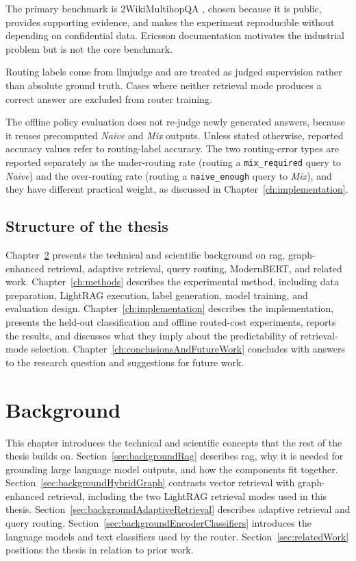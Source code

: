\documentclass[english, bibtex]{kththesis}               %
\numberwithin{listing}{chapter}
\begin{document}
The primary benchmark is 2WikiMultihopQA \cite{ho2020twowiki}, chosen because it is public, provides supporting evidence, and makes the experiment reproducible without depending on confidential data. Ericsson documentation motivates the industrial problem but is not the core benchmark.

Routing labels come from \gls{llmjudge} and are treated as judged supervision rather than absolute ground truth. Cases where neither retrieval mode produces a correct answer are excluded from router training.

The offline policy evaluation does not re-judge newly generated answers, because it reuses precomputed \emph{Naive} and \emph{Mix} outputs. Unless stated otherwise, reported accuracy values refer to routing-label accuracy. The two routing-error types are reported separately as the under-routing rate (routing a \texttt{mix\_required} query to \emph{Naive}) and the over-routing rate (routing a \texttt{naive\_enough} query to \emph{Mix}), and they have different practical weight, as discussed in Chapter~\ref{ch:implementation}.

\section{Structure of the thesis}
\label{sec:structure}

Chapter~\ref{ch:background} presents the technical and scientific background on \gls{rag}, graph-enhanced retrieval, adaptive retrieval, query routing, ModernBERT, and related work. Chapter~\ref{ch:methods} describes the experimental method, including data preparation, LightRAG execution, label generation, model training, and evaluation design. Chapter~\ref{ch:implementation} describes the implementation, presents the held-out classification and offline routed-cost experiments, reports the results, and discusses what they imply about the predictability of retrieval-mode selection. Chapter~\ref{ch:conclusionsAndFutureWork} concludes with answers to the research question and suggestions for future work.

\cleardoublepage
\chapter{Background}
\label{ch:background}

This chapter introduces the technical and scientific concepts that the rest of the thesis builds on. Section~\ref{sec:backgroundRag} describes \gls{rag}, why it is needed for grounding large language model outputs, and how the components fit together. Section~\ref{sec:backgroundHybridGraph} contrasts vector retrieval with graph-enhanced retrieval, including the two LightRAG retrieval modes used in this thesis. Section~\ref{sec:backgroundAdaptiveRetrieval} describes adaptive retrieval and query routing. Section~\ref{sec:backgroundEncoderClassifiers} introduces the language models and text classifiers used by the router. Section~\ref{sec:relatedWork} positions the thesis in relation to prior work.
\end{document}
